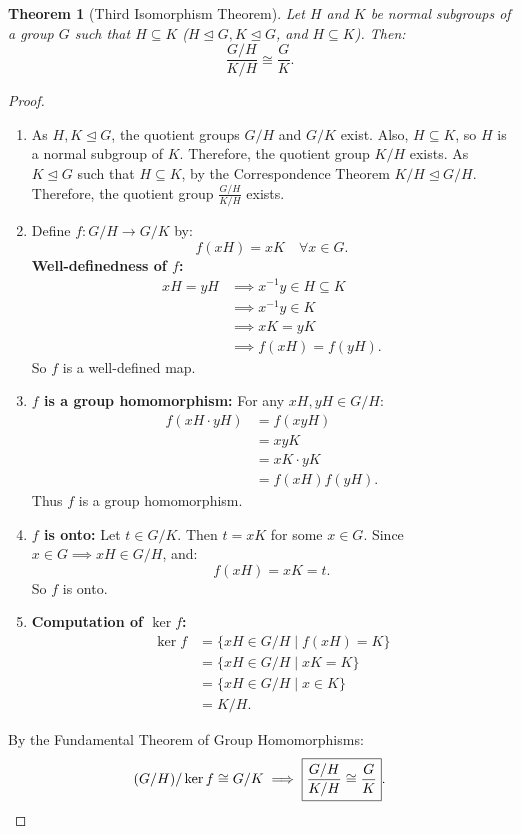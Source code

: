 \documentclass[12pt]{article}
\theoremstyle{definition}
\theoremstyle{plain}
\newtheorem{theorem}{Theorem}[section]
\begin{document}
\begin{theorem}[Third Isomorphism Theorem]
Let $H$ and $K$ be normal subgroups of a group $G$ such that $H \subseteq K$ ($H \trianglelefteq G, K \trianglelefteq G$, and $H \subseteq K$). Then:
\[
\frac{G/H}{K/H} \cong \frac{G}{K}.
\]
\end{theorem}

\begin{proof}
\begin{enumerate}
    \item As $H, K \trianglelefteq G$, the quotient groups $G/H$ and $G/K$ exist.
    Also, $H \subseteq K$, so $H$ is a normal subgroup of $K$. Therefore, the quotient group $K/H$ exists.
    As $K \trianglelefteq G$ such that $H \subseteq K$, by the Correspondence Theorem $K/H \trianglelefteq G/H$.
    Therefore, the quotient group $\frac{G/H}{K/H}$ exists.
    
    \item Define $f: G/H \to G/K$ by:
    \[
    f(xH) = xK \quad \forall x \in G.
    \]
    \textbf{Well-definedness of $f$:}
    \begin{align*}
    xH = yH &\implies x^{-1}y \in H \subseteq K \\
    &\implies x^{-1}y \in K \\
    &\implies xK = yK \\
    &\implies f(xH) = f(yH).
    \end{align*}
    So $f$ is a well-defined map.
    
    \item \textbf{$f$ is a group homomorphism:}
    For any $xH, yH \in G/H$:
    \begin{align*}
    f(xH \cdot yH) &= f(xyH) \\
    &= xyK \\
    &= xK \cdot yK \\
    &= f(xH) f(yH).
    \end{align*}
    Thus $f$ is a group homomorphism.
    
    \item \textbf{$f$ is onto:}
    Let $t \in G/K$. Then $t = xK$ for some $x \in G$.
    Since $x \in G \implies xH \in G/H$, and:
    \[
    f(xH) = xK = t.
    \]
    So $f$ is onto.
    
    \item \textbf{Computation of $\ker f$:}
    \begin{align*}
    \ker f &= \{ xH \in G/H \mid f(xH) = K \} \\
    &= \{ xH \in G/H \mid xK = K \} \\
    &= \{ xH \in G/H \mid x \in K \} \\
    &= K/H.
    \end{align*}
\end{enumerate}
By the Fundamental Theorem of Group Homomorphisms:
\[
(G/H)/\ker f \cong G/K \implies \boxed{\frac{G/H}{K/H} \cong \frac{G}{K}}. \qedhere
\]
\end{proof}
\end{document}
